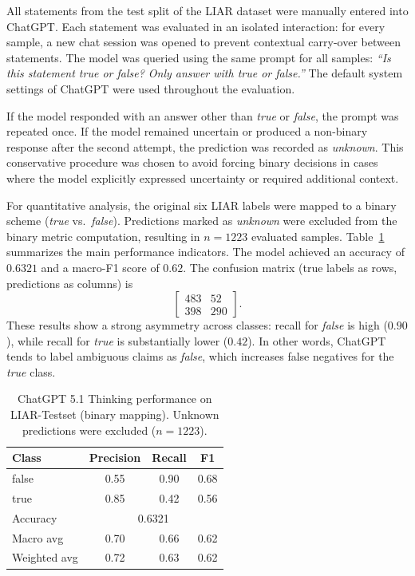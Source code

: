 All statements from the test split of the LIAR dataset were manually entered into ChatGPT. Each statement was evaluated in an isolated interaction: for every sample, a new chat session was opened to prevent contextual carry-over between statements. The model was queried using the same prompt for all samples: \emph{``Is this statement true or false? Only answer with true or false.''} The default system settings of ChatGPT were used throughout the evaluation.

If the model responded with an answer other than \textit{true} or \textit{false}, the prompt was repeated once. If the model remained uncertain or produced a non-binary response after the second attempt, the prediction was recorded as \textit{unknown}. This conservative procedure was chosen to avoid forcing binary decisions in cases where the model explicitly expressed uncertainty or required additional context.

For quantitative analysis, the original six LIAR labels were mapped to a binary scheme (\textit{true} vs.\ \textit{false}). Predictions marked as \textit{unknown} were excluded from the binary metric computation, resulting in $n=1223$ evaluated samples. Table~\ref{tab:chatgpt_metrics} summarizes the main performance indicators. The model achieved an accuracy of $0.6321$ and a macro-F1 score of $0.62$. The confusion matrix (true labels as rows, predictions as columns) is
\[
\begin{bmatrix}
483 & 52\\
398 & 290
\end{bmatrix}.
\]
These results show a strong asymmetry across classes: recall for \textit{false} is high ($0.90$), while recall for \textit{true} is substantially lower ($0.42$). In other words, ChatGPT tends to label ambiguous claims as \textit{false}, which increases false negatives for the \textit{true} class.

\FloatBarrier
\begin{table}[t]
\centering
\caption{ChatGPT 5.1 Thinking performance on LIAR-Testset (binary mapping). Unknown predictions were excluded ($n=1223$).}
\label{tab:chatgpt_metrics}
\begin{tabular}{lccc}
\toprule
Class & Precision & Recall & F1 \\
\midrule
false & 0.55 & 0.90 & 0.68 \\
true  & 0.85 & 0.42 & 0.56 \\
\midrule
Accuracy & \multicolumn{3}{c}{0.6321} \\
Macro avg & 0.70 & 0.66 & 0.62 \\
Weighted avg & 0.72 & 0.63 & 0.62 \\
\bottomrule
\end{tabular}
\end{table}

